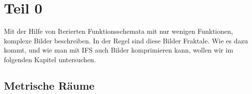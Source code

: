 %
%
%
\section{Teil 0\label{ifs:section:teil0}}
Mit der Hilfe von Iterierten Funktionsschemata mit nur wenigen Funktionen, komplexe Bilder beschreiben.
In der Regel sind diese Bilder Fraktale.
Wie es dazu kommt, und wie man mit IFS auch Bilder komprimieren kann, wollen wir im folgenden Kapitel untersuchen.

\subsection{Metrische Räume}


